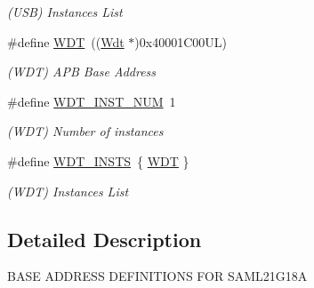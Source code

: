 \begin{DoxyCompactItemize}
\begin{DoxyCompactList}\small\item\em (U\+S\+B) Instances List \end{DoxyCompactList}\item 
\hypertarget{group___s_a_m_l21_g18_a__base_ga9646f603341e1ee220bf5d9948f05cb0}{}\#define \hyperlink{group___s_a_m_l21_g18_a__base_ga9646f603341e1ee220bf5d9948f05cb0}{W\+D\+T}~((\hyperlink{struct_wdt}{Wdt}      $\ast$)0x40001\+C00\+U\+L)\label{group___s_a_m_l21_g18_a__base_ga9646f603341e1ee220bf5d9948f05cb0}

\begin{DoxyCompactList}\small\item\em (W\+D\+T) A\+P\+B Base Address \end{DoxyCompactList}\item 
\hypertarget{group___s_a_m_l21_g18_a__base_gafac1297a6a4da34e5ff29b61dfb5552e}{}\#define \hyperlink{group___s_a_m_l21_g18_a__base_gafac1297a6a4da34e5ff29b61dfb5552e}{W\+D\+T\+\_\+\+I\+N\+S\+T\+\_\+\+N\+U\+M}~1\label{group___s_a_m_l21_g18_a__base_gafac1297a6a4da34e5ff29b61dfb5552e}

\begin{DoxyCompactList}\small\item\em (W\+D\+T) Number of instances \end{DoxyCompactList}\item 
\hypertarget{group___s_a_m_l21_g18_a__base_gacde2ac91a26c9c096b18f47009b48b81}{}\#define \hyperlink{group___s_a_m_l21_g18_a__base_gacde2ac91a26c9c096b18f47009b48b81}{W\+D\+T\+\_\+\+I\+N\+S\+T\+S}~\{ \hyperlink{group___s_a_m_l21_j18_a__base_ga9646f603341e1ee220bf5d9948f05cb0}{W\+D\+T} \}\label{group___s_a_m_l21_g18_a__base_gacde2ac91a26c9c096b18f47009b48b81}

\begin{DoxyCompactList}\small\item\em (W\+D\+T) Instances List \end{DoxyCompactList}\end{DoxyCompactItemize}


\subsection{Detailed Description}
B\+A\+S\+E A\+D\+D\+R\+E\+S\+S D\+E\+F\+I\+N\+I\+T\+I\+O\+N\+S F\+O\+R S\+A\+M\+L21\+G18\+A 
